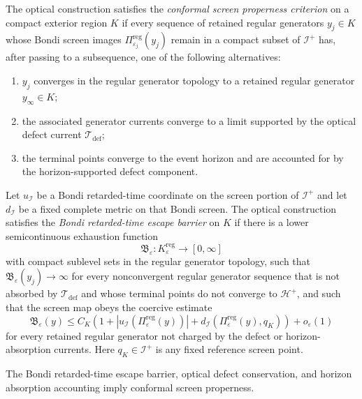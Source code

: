 \begin{definition}\label{def:ConformalScreenProperness}
The optical construction satisfies the \emph{conformal screen properness criterion} on a compact exterior region $K$ if every sequence of retained regular generators $y_j\in K$ whose Bondi screen images $\Pi_{\varepsilon_j}^{\mathrm{reg}}(y_j)$ remain in a compact subset of $\mathscr I^+$ has, after passing to a subsequence, one of the following alternatives:
\begin{enumerate}
    \item $y_j$ converges in the regular generator topology to a retained regular generator $y_\infty\in K$;
    \item the associated generator currents converge to a limit supported by the optical defect current $\mathcal T_{\mathrm{def}}$;
    \item the terminal points converge to the event horizon and are accounted for by the horizon-supported defect component.
\end{enumerate}
\end{definition}

\begin{definition}\label{def:BondiRetardedTimeEscapeBarrier}
Let $u_{\mathscr I}$ be a Bondi retarded-time coordinate on the screen portion of $\mathscr I^+$ and let $d_{\mathscr I}$ be a fixed complete metric on that Bondi screen. The optical construction satisfies the \emph{Bondi retarded-time escape barrier} on $K$ if there is a lower semicontinuous exhaustion function
\[
    \mathfrak B_\varepsilon:K_\varepsilon^{\mathrm{reg}}\longrightarrow[0,\infty]
\]
with compact sublevel sets in the regular generator topology, such that $\mathfrak B_\varepsilon(y_j)\to\infty$ for every nonconvergent regular generator sequence that is not absorbed by $\mathcal T_{\mathrm{def}}$ and whose terminal points do not converge to $\mathcal H^+$, and such that the screen map obeys the coercive estimate
\[
    \mathfrak B_\varepsilon(y)
    \le
    C_K
    \left(
        1
        +
        |u_{\mathscr I}(\Pi_\varepsilon^{\mathrm{reg}}(y))|
        +
        d_{\mathscr I}(\Pi_\varepsilon^{\mathrm{reg}}(y),q_K)
    \right)
    +
    o_\varepsilon(1)
\]
for every retained regular generator not charged by the defect or horizon-absorption currents. Here $q_K\in\mathscr I^+$ is any fixed reference screen point.
\end{definition}

\begin{lemma}\label{lem:RetardedBarrierConformalProperness}
The Bondi retarded-time escape barrier, optical defect conservation, and horizon absorption accounting imply conformal screen properness.
\end{lemma}

